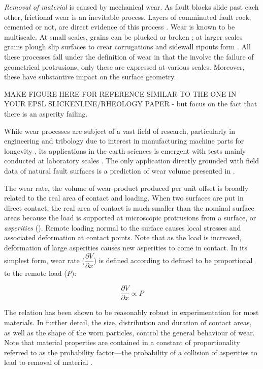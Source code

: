 \documentclass[12pt,a4paper]{article}
\begin{document}
\textit{Removal of material} is caused by mechanical wear. As fault blocks slide past each other, frictional wear is an inevitable process. Layers of comminuted fault rock, cemented or not, are direct evidence of this process \cite{power1988roughness, scholz1987wear}. Wear is known to be multiscale. At small scales, grains can be plucked or broken \cite{shervais2016smoothing}; at larger scales grains plough slip surfaces to crear corrugations \cite{scholz1976role} and sidewall ripouts form \cite{swanson1989sidewall}. All these processes fall under the definition of wear in that the involve the failure of geometrical protrusions, only these are expressed at various scales. Moreover, these have substantive impact on the surface geometry.

MAKE FIGURE HERE FOR REFERENCE SIMILAR TO THE ONE IN YOUR EPSL SLICKENLINE/RHEOLOGY PAPER - but focus on the fact that there is an asperity failing. 

While wear processes are subject of a vast field of research, particularly in engineering and tribology due to interest in manufacturing machine parts for longevity \cite{meng1995wear}, its  applications in the earth sciences is emergent with tests mainly conducted at laboratory scales \cite{power1988roughness, scholz1987wear, wang1994wear, rathburn2013Numerical}. The only application directly grounded with field data of natural fault surfaces is a prediction of wear volume presented in \citet{brodsky2011faults}. 

The wear rate, the volume of wear-product produced per unit offset is broadly related to the real area of contact and loading. When two surfaces are put in direct contact, the real area of contact is much smaller than the nominal surface areas because the load is supported at microscopic protrusions from a surface, or \textit{asperities} (\cite{archard1953contact, greenwood1966contact, bowden2001friction, dieterich1996imaging}). Remote loading normal to the surface causes local stresses and associated deformation at contact points. Note that as the load is increased, deformation of large asperities causes new asperities to come in contact. In its simplest form, wear rate ($\dfrac{\partial V}{\partial x}$) is defined according to defined to be proportional to the remote load ($P$):

\begin{equation}
\dfrac{\partial V}{\partial x}\varpropto P
\end{equation}

The relation has been shown to be reasonably robust in experimentation for most materials. In further detail, the size, distribution and duration of contact areas, as well as the shape of the worn particles, control the general behaviour of wear. Note that material properties are contained in a constant of proportionality referred to as the probability factor—the probability of a collision of asperities to lead to removal of material \cite{archard1953contact}.
\end{document}
